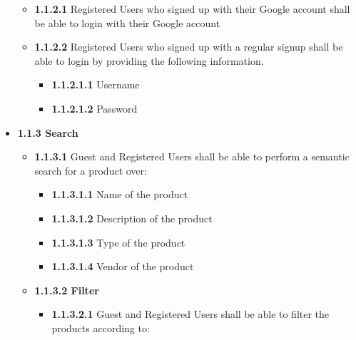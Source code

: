\documentclass[]{article}
\providecommand{\tightlist}{%
  \setlength{\itemsep}{0pt}\setlength{\parskip}{0pt}}
\begin{document}
\begin{itemize}
          \begin{itemize}
              \item
                    \textbf{1.1.2.1} Registered Users who signed up with their Google
                    account shall be able to login with their Google account
              \item
                    \textbf{1.1.2.2} Registered Users who signed up with a regular
                    signup shall be able to login by providing the following
                    information.

                    \begin{itemize}
                        \tightlist
                        \item
                              \textbf{1.1.2.1.1} Username
                        \item
                              \textbf{1.1.2.1.2} Password
                    \end{itemize}
          \end{itemize}
    \item
          \textbf{1.1.3 Search}

          \begin{itemize}
              \item
                    \textbf{1.1.3.1} Guest and Registered Users shall be able to perform
                    a semantic search for a product over:

                    \begin{itemize}
                        \tightlist
                        \item
                              \textbf{1.1.3.1.1} Name of the product
                        \item
                              \textbf{1.1.3.1.2} Description of the product
                        \item
                              \textbf{1.1.3.1.3} Type of the product
                        \item
                              \textbf{1.1.3.1.4} Vendor of the product
                    \end{itemize}
              \item
                    \textbf{1.1.3.2 Filter}

                    \begin{itemize}
                        \item
                              \textbf{1.1.3.2.1} Guest and Registered Users shall be able to
                              filter the products according to:


\end{itemize}
\end{itemize}
\end{itemize}
\end{document}

